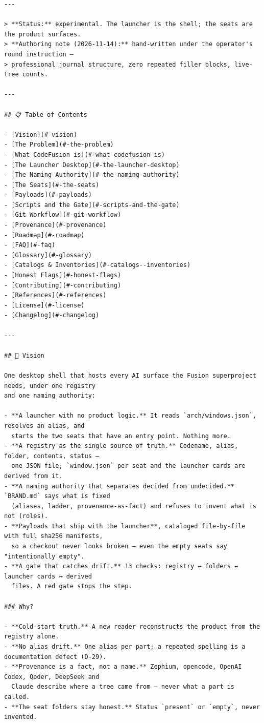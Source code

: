 \begin{Verbatim}[breaklines,breakanywhere,fontsize=\footnotesize]
---

> **Status:** experimental. The launcher is the shell; the seats are the product surfaces.
> **Authoring note (2026-11-14):** hand-written under the operator's round instruction —
> professional journal structure, zero repeated filler blocks, live-tree counts.

---

## 📋 Table of Contents

- [Vision](#-vision)
- [The Problem](#-the-problem)
- [What CodeFusion is](#-what-codefusion-is)
- [The Launcher Desktop](#-the-launcher-desktop)
- [The Naming Authority](#-the-naming-authority)
- [The Seats](#-the-seats)
- [Payloads](#-payloads)
- [Scripts and the Gate](#-scripts-and-the-gate)
- [Git Workflow](#-git-workflow)
- [Provenance](#-provenance)
- [Roadmap](#-roadmap)
- [FAQ](#-faq)
- [Glossary](#-glossary)
- [Catalogs & Inventories](#-catalogs--inventories)
- [Honest Flags](#-honest-flags)
- [Contributing](#-contributing)
- [References](#-references)
- [License](#-license)
- [Changelog](#-changelog)

---

## 🎯 Vision

One desktop shell that hosts every AI surface the Fusion superproject needs, under one registry
and one naming authority:

- **A launcher with no product logic.** It reads `arch/windows.json`, resolves an alias, and
  starts the two seats that have an entry point. Nothing more.
- **A registry as the single source of truth.** Codename, alias, folder, contents, status —
  one JSON file; `window.json` per seat and the launcher cards are derived from it.
- **A naming authority that separates decided from undecided.** `BRAND.md` says what is fixed
  (aliases, ladder, provenance-as-fact) and refuses to invent what is not (roles).
- **Payloads that ship with the launcher**, cataloged file-by-file with full sha256 manifests,
  so a checkout never looks broken — even the empty seats say "intentionally empty".
- **A gate that catches drift.** 13 checks: registry ↔ folders ↔ launcher cards ↔ derived
  files. A red gate stops the step.

### Why?

- **Cold-start truth.** A new reader reconstructs the product from the registry alone.
- **No alias drift.** One alias per part; a repeated spelling is a documentation defect (D-29).
- **Provenance is a fact, not a name.** Zephium, opencode, OpenAI Codex, Qoder, DeepSeek and
  Claude describe where a tree came from — never what a part is called.
- **The seat folders stay honest.** Status `present` or `empty`, never invented.


\end{Verbatim}
